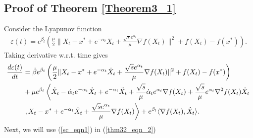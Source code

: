 \documentclass{article}
\theoremstyle{plain}
\theoremstyle{definition}
\theoremstyle{remark}
\begin{document}
\subsection{Proof of Theorem \ref{Theorem3_1}}\label{thm4_proof}
Consider the Lyapunov function
    \begin{align}\label{thm32_eqn_1}
        \varepsilon(t) = e^{\beta_t}\left(\frac{\mu}{2}\|X_t-x^*+e^{-\alpha_t}\dot X_t+\frac{\sqrt{s}e^{\alpha_t}}{\mu}\nabla f(X_t)\|^2+f(X_t)-f(x^*)\right).
    \end{align}
    Taking derivative w.r.t. time gives
    \begin{align}\label{thm32_eqn_2}
       \frac{d\varepsilon(t)}{dt}&=\dot \beta e^{\beta_t}\left(\frac{\mu}{2}\|X_t-x^*+e^{-\alpha_t}\dot X_t+\frac{\sqrt{s}e^{\alpha_t}}{\mu}\nabla f(X_t)\|^2+f(X_t)-f(x^*)\right)\nonumber\\
       & + \mu e^{\beta_t}\left\langle \dot X_t-\dot \alpha_t e^{-\alpha_t}\dot X_t + e^{-\alpha_t}\Ddot{X}_t +\frac{\sqrt{s}}{\mu}\dot \alpha_te^{\alpha_t}\nabla f(X_t)+\frac{\sqrt{s}}{\mu}e^{\alpha_t}\nabla ^2f(X_t)\dot X_t\right.\nonumber\\
       &\left. ,X_t-x^*+e^{-\alpha_t}\dot X_t+\frac{\sqrt{s}e^{\alpha_t}}{\mu}\nabla f(X_t)\right\rangle+e^{\beta_t}\langle \nabla f(X_t),\dot X_t \rangle.
    \end{align}
    Next, we will use (\ref{sc_eqn1}) in (\ref{thm32_eqn_2})
\end{document}
